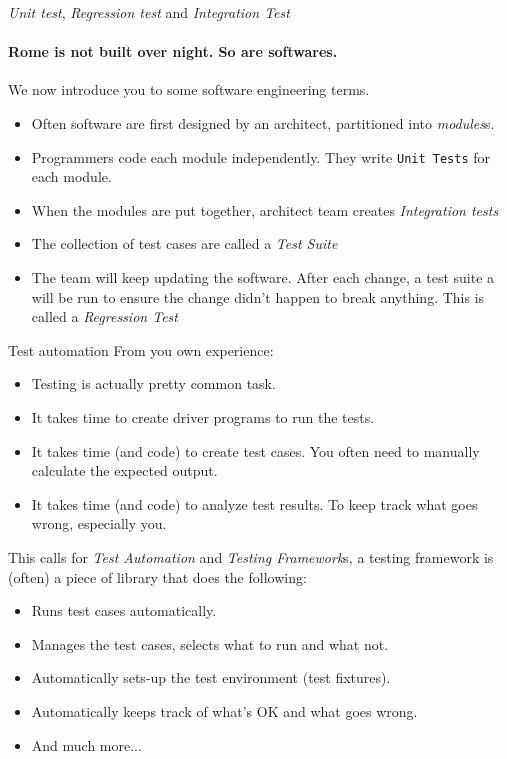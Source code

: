 \begin{frame}{\textit{Unit test}, \textit{Regression test} and \textit{Integration Test} }
\framesubtitle{Rome is not built over night. So are softwares.}

We now introduce you to some software engineering terms.

\begin{itemize}
	\item Often software are first designed by an architect, partitioned into \textit{modules}s.
	\item Programmers code each module independently. They write \texttt{Unit Tests} for each module.
	\item When the modules are put together, architect team creates \textit{Integration tests}
	\item The collection of test cases are called a \textit{Test Suite}
	\item The team will keep updating the software. After each change, a test suite a will be run to ensure the change didn't happen to break anything. This is called a \textit{Regression Test}
\end{itemize}
\end{frame}

\begin{frame}{Test automation}
From you own experience:
\begin{itemize}
	\item Testing is actually pretty common task.
	\item It takes time to create driver programs to run the tests.
	\item It takes time (and code) to create test cases. You often need to manually calculate the expected output.
	\item It takes time (and code) to analyze test results. To keep track what goes wrong, especially you.
\end{itemize}
This calls for \textit{Test Automation} and \textit{Testing Framework}s, a testing framework is (often) a piece of library that does the following:
\begin{itemize}
	\item Runs test cases automatically.
	\item Manages the test cases, selects what to run and what not.
	\item Automatically sets-up the test environment (test fixtures).
	\item Automatically keeps track of what's OK and what goes wrong.
	\item And much more...
\end{itemize}
\end{frame}

